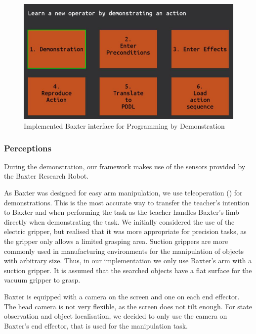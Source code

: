 \begin{figure}[h]
	\centering
	\includegraphics[scale=0.5]{figures/interface}
	\caption{Implemented Baxter interface for Programming by Demonstration}
	\label{fig:interface}
\end{figure}





\subsubsection{Perceptions}
During the demonstration, our framework makes use of the sensors provided by the Baxter Research Robot.

As Baxter was designed for easy arm manipulation, we use teleoperation () for demonstrations.
This is the most accurate way to transfer the teacher's intention to Baxter and when performing the task as the teacher handles Baxter's limb directly when demonstrating the task.
We initially considered the use of the electric gripper, but realised that it was more appropriate for precision tasks, as the gripper only allows a limited grasping area.
Suction grippers are more commonly used in manufacturing environments for the manipulation of objects with arbitrary size.
Thus, in our implementation we only use Baxter's arm with a suction gripper.
It is assumed that the searched objects have a flat surface for the vacuum gripper to grasp.

Baxter is equipped with a camera on the screen and one on each end effector.
The head camera is not very flexible, as the screen does not tilt enough.
For state observation and object localisation, we decided to only use the camera on Baxter's end effector, that is used for the manipulation task.


